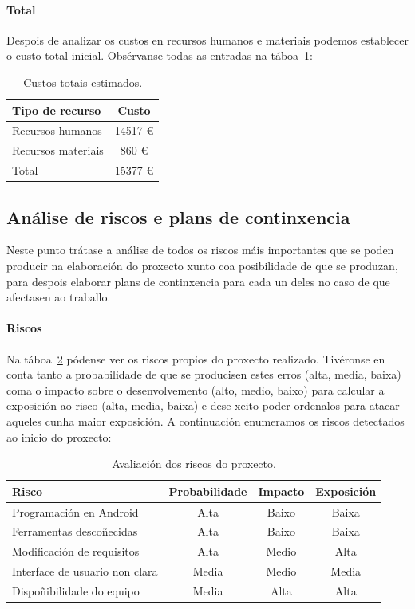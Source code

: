 \paragraph{Total}
Despois de analizar os custos en recursos humanos e materiais podemos establecer o custo total inicial. Obsérvanse todas as entradas na táboa~\ref{tab:custoTotalEstimado}:

\begin{table} [tbh]
	\centering
	\begin{tabular}{|l|c|}
		\hline 
		\textbf{Tipo de recurso} & \textbf{Custo} \\ 
		\hline 
		Recursos humanos & 14517 € \\ 
		\hline 
		Recursos materiais & 860 € \\ 
		\hline 
		Total & 15377 € \\ 
		\hline 
	\end{tabular}
	\caption{Custos totais estimados.}
	\label{tab:custoTotalEstimado}
\end{table}

\subsection{Análise de riscos e plans de continxencia}
Neste punto trátase a análise de todos os riscos máis importantes que se poden producir na elaboración do proxecto xunto coa posibilidade de que se produzan, para despois elaborar plans de continxencia para cada un deles no caso de que afectasen ao traballo.

\paragraph{Riscos}
Na táboa~\ref{tab:riscos} pódense ver os riscos propios do proxecto realizado. Tivéronse en conta tanto a probabilidade de que se producisen estes erros (alta, media, baixa) coma o impacto sobre o desenvolvemento (alto, medio, baixo) para calcular a exposición ao risco (alta, media, baixa) e dese xeito poder ordenalos para atacar aqueles cunha maior exposición.
A continuación enumeramos os riscos detectados ao inicio do proxecto:

\begin{table} [tbh]
	\centering
	\begin{tabular}{|l|c|c|c|}
		\hline 
		\textbf{Risco} & \textbf{Probabilidade} & \textbf{Impacto} & \textbf{Exposición} \\ 
		\hline 
		Programación en Android & Alta & Baixo & Baixa \\ 
		\hline 
		Ferramentas descoñecidas & Alta & Baixo & Baixa \\ 
		\hline 
		Modificación de requisitos & Alta & Medio & Alta \\ 
		\hline 
		Interface de usuario non clara & Media & Medio & Media \\ 
		\hline 
		Dispoñibilidade do equipo & Media & Alta & Alta \\ 
		\hline 
	\end{tabular}
	\caption{Avaliación dos riscos do proxecto.}
	\label{tab:riscos}
\end{table}

